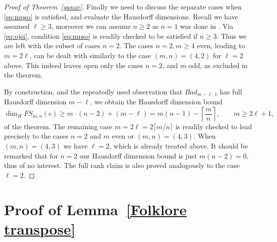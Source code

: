 \documentclass[10pt]{amsart}
\theoremstyle{definition}
\begin{document}
\begin{proof}[Proof of Theorem~\ref{ganze}]
    Finally we need to discuss the separate cases when \eqref{eq:mpso} is satisfied, and evaluate the Hausdorff dimensions.
    Recall we have assumed $\ell\ge 3$, moreover
    we can assume $n\ge 2$ as $n=1$ was done in \cite{j2}. Via \eqref{eq:ojsi}, condition \eqref{eq:mpso} is readily checked to be satisfied if $n\ge 3$. Thus we are left with the subset of cases $n=2$. The cases
    $n=2, m\ge 4$ even, leading to $m=2\ell$, can be dealt with similarly to the case $(m,n)=(4,2)$ for $\ell=2$ above. This indeed leaves open only the cases $n=2$, and $m$ odd, as excluded in the theorem. 
    
    By construction, and the repeatedly used observation that
    $Bad_{m-\ell ,1}$ has full Hausdorff dimension $m-\ell$, we obtain the Hausdorff dimension bound
     \[
    \dim_H FS_{m,n}(c) \ge
    m\cdot (n-2)+(m-\ell)=m(n-1)-\left\lceil\frac{m}{n}\right\rceil, \qquad m\ge 2\ell+1,
    \]
    of the theorem. The remaining case $m=2\ell=2\lceil m/n\rceil$ 
    is readily checked to lead precisely to the cases $n=2$ and $m$ even 
    or $(m,n)=(4,3)$. When $(m,n)=(4,3)$ we have $\ell=2$, which is already treated above. It should be remarked that for $n=2$ our Hausdorff dimension bound is just $m(n-2)=0$, thus of no interest. The full rank claim is also proved analogously to the case $\ell=2$.
\end{proof}  



\section{Proof of Lemma~\ref{Folklore transpose}} \label{Sect10}
\end{document}
